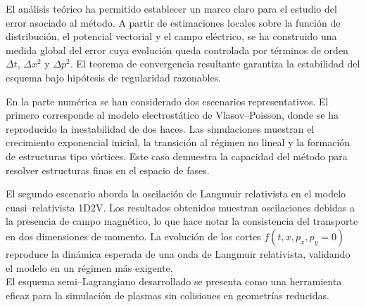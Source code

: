 \documentclass[11pt,a4paper,twoside,pdf]{article}
\numberwithin{equation}{section}
\begin{document}
El análisis teórico ha permitido establecer un marco claro para el estudio del
error asociado al método. A partir de estimaciones locales sobre la función de
distribución, el potencial vectorial y el campo eléctrico, se ha construido una
medida global del error cuya evolución queda controlada por términos de orden
$\Delta t$, $\Delta x^2$ y $\Delta p^2$. El teorema de convergencia resultante garantiza
la estabilidad del esquema bajo hipótesis de regularidad razonables.

En la parte numérica se han considerado dos escenarios representativos. El
primero corresponde al modelo electrostático de Vlasov--Poisson, donde se ha
reproducido la inestabilidad de dos haces. Las simulaciones muestran el
crecimiento exponencial inicial, la transición al régimen no lineal y la
formación de estructuras tipo vórtices. Este caso demuestra la capacidad del método para resolver
estructuras finas en el espacio de fases.

El segundo escenario aborda la oscilación de Langmuir relativista en el modelo
cuasi--relativista 1D2V. Los resultados obtenidos muestran oscilaciones debidas a la presencia de campo magnético, lo que hace notar la consistencia del transporte en dos
dimensiones de momento. La evolución de los cortes $f(t,x,p_x,p_y=0)$
reproduce la dinámica esperada de una onda de Langmuir relativista, validando el
modelo en un régimen más exigente.\\

El esquema semi--Lagrangiano desarrollado se presenta como una
herramienta eficaz para la simulación de plasmas sin colisiones en geometrías
reducidas. 








\newpage






\end{document}
